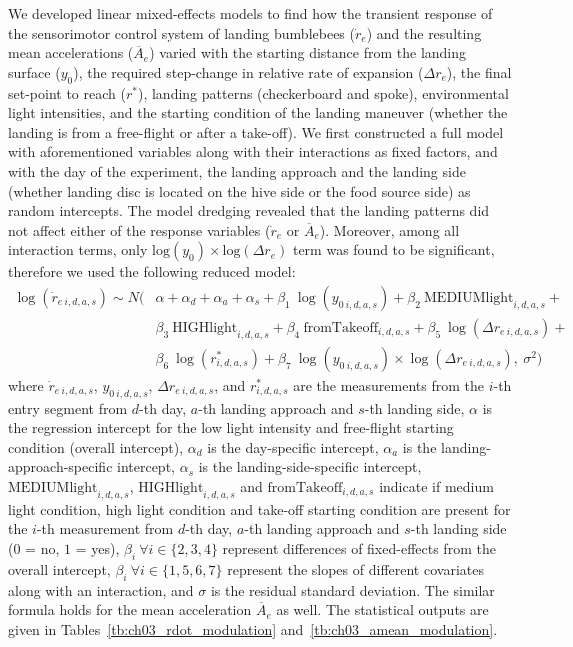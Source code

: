 We developed linear mixed-effects models to find how the transient response of the sensorimotor control system of landing bumblebees ($\dot{r}_e$) and the resulting mean accelerations ($\overline{A}_e$) varied with the starting distance from the landing surface ($y_0$), the required step-change in relative rate of expansion ($\Delta r_e$), the final set-point to reach ($r^*$), landing patterns (checkerboard and spoke), environmental light intensities, and the starting condition of the landing maneuver (whether the landing is from a free-flight or after a take-off). We first constructed a full model with aforementioned variables along with their interactions as fixed factors, and with the day of the experiment, the landing approach and the landing side (whether landing disc is located on the hive side or the food source side) as random intercepts. The model dredging revealed that the landing patterns did not affect either of the response variables ($\dot{r}_e$ or $\overline{A}_e$). Moreover, among all interaction terms, only $\text{log}(y_0)\times \text{log}(\Delta r_e)$ term was found to be significant, therefore we used the following reduced model:
\begin{equation}
	\label{eq:ch03_bbee_rdot_amean_model}
	\begin{array}{lll}
		\!\!\!\!\!\! \log(\dot{r}_{e~i,d,a,s}) \sim N( \!\!\!\!\!
		& \alpha + \alpha_d + \alpha_a + \alpha_s + \beta_1~\log(y_{0~i,d,a,s}) + \beta_2~\textrm{MEDIUMlight}_{i,d,a,s} + \\
		&\beta_3~\textrm{HIGHlight}_{i,d,a,s} + \beta_4~\textrm{fromTakeoff}_{i,d,a,s} + \beta_5~\log(\Delta r_{e~i,d,a,s}) + \\
		&\beta_6~\log(r^*_{i,d,a,s}) + \beta_7~\log(y_{0~i,d,a,s})\times \log(\Delta r_{e~i,d,a,s}),~\sigma^2)
	\end{array}                                          
\end{equation}
where $\dot{r}_{e~i,d,a,s}$, $y_{0~i,d,a,s}$, $\Delta r_{e~i,d,a,s}$, and $r^*_{i,d,a,s}$ are the measurements from the $i$-th entry segment from $d$-th day, $a$-th landing approach and $s$-th landing side, $\alpha$ is the regression intercept for the low light intensity and free-flight starting condition (overall intercept), $\alpha_d$ is the day-specific intercept, $\alpha_a$ is the landing-approach-specific intercept, $\alpha_s$ is the landing-side-specific intercept, $\textrm{MEDIUMlight}_{i,d,a,s}$, $\textrm{HIGHlight}_{i,d,a,s}$ and $\textrm{fromTakeoff}_{i,d,a,s}$ indicate if medium light condition, high light condition and take-off starting condition are present for the $i$-th measurement from $d$-th day, $a$-th landing approach and $s$-th landing side ($0$ = no, $1$ = yes), $\beta_i~\forall i \in \{2,3,4\}$ represent differences of fixed-effects from the overall intercept, $\beta_i~\forall i \in \{1,5,6,7\}$ represent the slopes of different covariates along with an interaction, and $\sigma$ is the residual standard deviation. The similar formula holds for the mean acceleration $\overline{A}_e$ as well. The statistical outputs are given in Tables~\ref{tb:ch03_rdot_modulation} and~\ref{tb:ch03_amean_modulation}.

